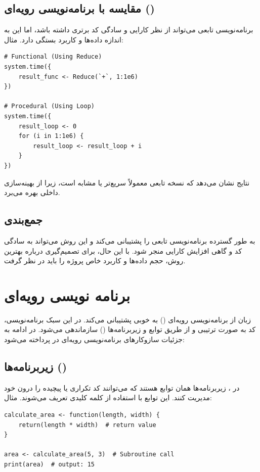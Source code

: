 \documentclass[11pt, a4paper, oneside]{book}
\begin{document}
			
		\section{مقایسه با برنامه‌نویسی رویه‌ای ()}
			
			برنامه‌نویسی تابعی می‌تواند از نظر کارایی و سادگی کد برتری داشته باشد، اما این به اندازه داده‌ها و کاربرد بستگی دارد.
			مثال:
		
			\begin{latin}
				\begin{lstlisting}[caption={\lr{Map - Filter - Reduce}}] 
# Functional (Using Reduce)
system.time({
	result_func <- Reduce(`+`, 1:1e6)
})

# Procedural (Using Loop)
system.time({
	result_loop <- 0
	for (i in 1:1e6) {
		result_loop <- result_loop + i
	}
})

				\end{lstlisting}
			\end{latin}
			
			نتایج نشان می‌دهد که نسخه تابعی معمولاً سریع‌تر یا مشابه است، زیرا از بهینه‌سازی داخلی  بهره می‌برد.
			
		
		\section{جمع‌بندی}
		
			به طور گسترده برنامه‌نویسی تابعی را پشتیبانی می‌کند و این روش می‌تواند به سادگی کد و گاهی افزایش کارایی منجر شود. با این حال، برای تصمیم‌گیری درباره بهترین روش، حجم داده‌ها و کاربرد خاص پروژه را باید در نظر گرفت.
			
			
	\chapter{برنامه نویسی رویه‌ای}
	
		زبان  از برنامه‌نویسی رویه‌ای () به خوبی پشتیبانی می‌کند. در این سبک برنامه‌نویسی، کد به صورت ترتیبی و از طریق توابع و زیربرنامه‌ها () سازماندهی می‌شود. در ادامه به جزئیات سازوکارهای برنامه‌نویسی رویه‌ای در  پرداخته می‌شود:
		
		\section{زیربرنامه‌ها ()}
			
			در ، زیربرنامه‌ها همان توابع هستند که می‌توانند کد تکراری یا پیچیده را درون خود مدیریت کنند. این توابع با استفاده از کلمه کلیدی  تعریف می‌شوند.
			مثال:
			\begin{latin}
				\begin{lstlisting}[caption={\lr{Subroutines}}] 
calculate_area <- function(length, width) {
	return(length * width)  # return value
}

area <- calculate_area(5, 3)  # Subroutine call
print(area)  # output: 15

				\end{lstlisting}
			\end{latin}
		
\end{document}
